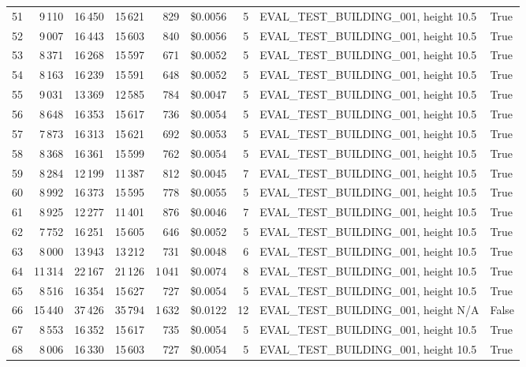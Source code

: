 \documentclass[a4paper,11pt]{article}
\begin{document}
\begin{table}[ht]
\begin{tabular}{r r r r r r r p{3cm} l}
51 & 9\,110 & 16\,450 & 15\,621 & 829 & \$0.0056 & 5 & EVAL\_TEST\_BUILDING\_001, height 10.5 & True \\
52 & 9\,007 & 16\,443 & 15\,603 & 840 & \$0.0056 & 5 & EVAL\_TEST\_BUILDING\_001, height 10.5 & True \\
53 & 8\,371 & 16\,268 & 15\,597 & 671 & \$0.0052 & 5 & EVAL\_TEST\_BUILDING\_001, height 10.5 & True \\
54 & 8\,163 & 16\,239 & 15\,591 & 648 & \$0.0052 & 5 & EVAL\_TEST\_BUILDING\_001, height 10.5 & True \\
55 & 9\,031 & 13\,369 & 12\,585 & 784 & \$0.0047 & 5 & EVAL\_TEST\_BUILDING\_001, height 10.5 & True \\
56 & 8\,648 & 16\,353 & 15\,617 & 736 & \$0.0054 & 5 & EVAL\_TEST\_BUILDING\_001, height 10.5 & True \\
57 & 7\,873 & 16\,313 & 15\,621 & 692 & \$0.0053 & 5 & EVAL\_TEST\_BUILDING\_001, height 10.5 & True \\
58 & 8\,368 & 16\,361 & 15\,599 & 762 & \$0.0054 & 5 & EVAL\_TEST\_BUILDING\_001, height 10.5 & True \\
59 & 8\,284 & 12\,199 & 11\,387 & 812 & \$0.0045 & 7 & EVAL\_TEST\_BUILDING\_001, height 10.5 & True \\
60 & 8\,992 & 16\,373 & 15\,595 & 778 & \$0.0055 & 5 & EVAL\_TEST\_BUILDING\_001, height 10.5 & True \\
61 & 8\,925 & 12\,277 & 11\,401 & 876 & \$0.0046 & 7 & EVAL\_TEST\_BUILDING\_001, height 10.5 & True \\
62 & 7\,752 & 16\,251 & 15\,605 & 646 & \$0.0052 & 5 & EVAL\_TEST\_BUILDING\_001, height 10.5 & True \\
63 & 8\,000 & 13\,943 & 13\,212 & 731 & \$0.0048 & 6 & EVAL\_TEST\_BUILDING\_001, height 10.5 & True \\
64 & 11\,314 & 22\,167 & 21\,126 & 1\,041 & \$0.0074 & 8 & EVAL\_TEST\_BUILDING\_001, height 10.5 & True \\
65 & 8\,516 & 16\,354 & 15\,627 & 727 & \$0.0054 & 5 & EVAL\_TEST\_BUILDING\_001, height 10.5 & True \\
66 & 15\,440 & 37\,426 & 35\,794 & 1\,632 & \$0.0122 & 12 & EVAL\_TEST\_BUILDING\_001, height N/A & False \\
67 & 8\,553 & 16\,352 & 15\,617 & 735 & \$0.0054 & 5 & EVAL\_TEST\_BUILDING\_001, height 10.5 & True \\
68 & 8\,006 & 16\,330 & 15\,603 & 727 & \$0.0054 & 5 & EVAL\_TEST\_BUILDING\_001, height 10.5 & True \\

\end{tabular}
\end{table}
\end{document}
